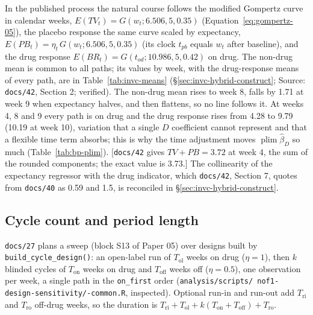 \documentclass[11pt]{article}
\newcommand{\note}[1]{\textcolor{blue!60!black}{\small [#1]}}
\newcommand{\code}[1]{\texttt{#1}}
\begin{document}
In the published process the natural course follows the modified
Gompertz curve in calendar weeks, $E(TV_t) = G(w_t; 6.506, 5, 0.35)$
(Equation~\eqref{eq:gompertz-05}), the placebo response the same curve
scaled by expectancy, $E(PB_t) = \eta_t\,G(w_t; 6.506, 5, 0.35)$
(its clock $t_{pb}$ equals $w_t$ after baseline), and the drug response
$E(BR_t) = G(t_{od}; 10.986, 5, 0.42)$ on drug. The non-drug mean is
common to all paths; its values by week, with the drug-response means
of every path, are in Table~\ref{tab:invc-means}
(\S\ref{sec:invc-hybrid-construct}; Source: \code{docs/42}, Section 2;
verified). The non-drug mean rises to week 8, falls by 1.71 at week 9 when
expectancy halves, and then flattens, so no line follows it. At weeks 4,
8 and 9 every path is on drug and the drug response rises from 4.28 to
9.79 (10.19 at week 10), variation that a single $D$ coefficient cannot
represent and that a flexible time term absorbs; this is why the time
adjustment moves $\operatorname{plim}\hat\beta_D$ so much
(Table~\ref{tab:bp-plim}). \note{\code{docs/42} gives $TV + PB = 3.72$
at week 4, the sum of the rounded components; the exact value is
3.73.} The collinearity of the expectancy regressor with the drug
indicator, which \code{docs/42}, Section 7, quotes from \code{docs/40}
as 0.59 and 1.5, is reconciled in \S\ref{sec:invc-hybrid-construct}.

\subsection{Cycle count and period length}
\label{sec:invb-cycles}

\code{docs/27} plans a sweep (block S13 of Paper 05) over designs
built by \code{build\_cycle\_design()}: an open-label run of
$T_{\mathrm{ol}}$ weeks on drug ($\eta = 1$), then $k$ blinded cycles
of $T_{\mathrm{on}}$ weeks on drug and $T_{\mathrm{off}}$ weeks off
($\eta = 0.5$), one observation per week, a single path in the
\code{on\_first} order (\code{analysis/\allowbreak scripts/\allowbreak
nof1-design-sensitivity/\allowbreak 00-common.R}, inspected). Optional
run-in and run-out add $T_{\mathrm{ri}}$ and $T_{\mathrm{ro}}$ off-drug
weeks, so the duration is $T_{\mathrm{ri}} + T_{\mathrm{ol}} +
k(T_{\mathrm{on}} + T_{\mathrm{off}}) + T_{\mathrm{ro}}$.
\end{document}
